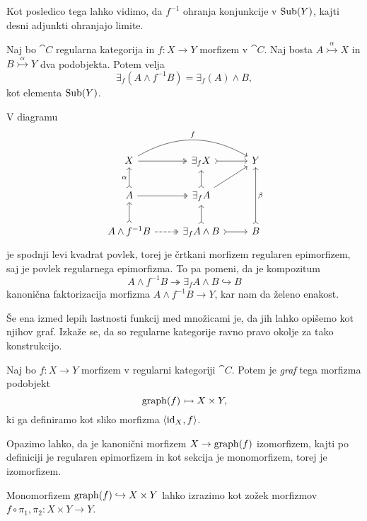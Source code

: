 \documentclass[../kategoricna_logika.tex]{subfiles}
\begin{document}
\noindent
Kot posledico tega lahko vidimo, da $f^{-1}$ ohranja konjunkcije v
$\operatorname{Sub}(Y)$, kajti desni adjunkti ohranjajo limite.
\begin{lema}\label{lema:frobeniusova-lema}
  Naj bo $\cat{C}$ regularna kategorija in ${f : X \to Y}$ morfizem v
  $\cat{C}$.  Naj bosta $A \overset{\alpha}{\rightarrowtail} X$ in
  $B \overset{\alpha}{\rightarrowtail} Y$ dva podobjekta.  Potem velja
  $$\exists_f(A \wedge f^{-1}B) = \exists_f(A) \wedge B,$$
  kot elementa $\operatorname{Sub}(Y)$.
\end{lema}
\begin{dokaz}
  V diagramu
  \begin{equation*}
    \begin{tikzcd}
      X \ar[rr, bend left, "f"] \ar[r, two heads] & \exists_f X \ar[r, tail] & Y \\
      A \ar[u, tail, "\alpha"] \ar[r, two heads] & \exists_f A \ar[u, tail] \ar[ur] & \\
      A \land f^{-1}B \ar[u, tail] \ar[r, dashed, two heads] &
      \exists_f A \land B \ar[r, tail] \ar[u, tail] & B \ar[uu, tail,
      "\beta"']
    \end{tikzcd}
  \end{equation*}
  je spodnji levi kvadrat povlek, torej je črtkani morfizem regularen
  epimorfizem, saj je povlek regularnega epimorfizma.  To pa pomeni,
  da je kompozitum
  \[A \land f^{-1}B \twoheadrightarrow \exists_f A \land B
    \hookrightarrow B\] kanonična faktorizacija morfizma
  $A \land f^{-1}B \to Y$, kar nam da želeno enakost.
\end{dokaz}
Še ena izmed lepih lastnosti funkcij med množicami je, da jih lahko
opišemo kot njihov graf.  Izkaže se, da so regularne kategorije ravno
pravo okolje za tako konstrukcijo.
\begin{definicija}\label{definicija:graf-morfizma}
  Naj bo $f : X \to Y$ morfizem v regularni kategoriji
  $\cat{C}$. Potem je \emph{graf} tega morfizma podobjekt
  $$\operatorname{graph}(f) \rightarrowtail X \times Y,$$
  ki ga definiramo kot sliko morfizma $\langle \mathrm{id}_X, f \rangle$.
\end{definicija}
Opazimo lahko, da je kanonični morfizem $X \to \operatorname{graph}(f)$ izomorfizem,
kajti po definiciji je regularen epimorfizem in kot sekcija je
monomorfizem, torej je izomorfizem.
\begin{lema}\label{lema:graf-kot-zozek}
  Monomorfizem $\operatorname{graph}(f) \hookrightarrow X \times Y$ lahko izrazimo
  kot zožek morfizmov $f\circ \pi_1, \pi_2 : X \times Y \to Y$.
\end{lema}
\end{document}
